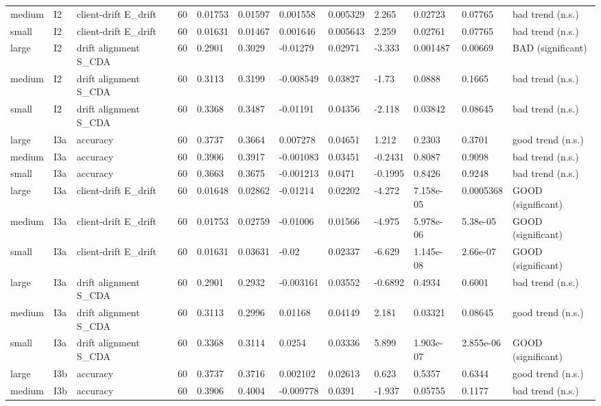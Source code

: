 \begin{table}[t]
\begin{tabular}{llllllllllll}
medium & I2 & client-drift E\_drift & 60 & 0.01753 & 0.01597 & 0.001558 & 0.005329 & 2.265 & 0.02723 & 0.07765 & bad trend (n.s.) \\
small & I2 & client-drift E\_drift & 60 & 0.01631 & 0.01467 & 0.001646 & 0.005643 & 2.259 & 0.02761 & 0.07765 & bad trend (n.s.) \\
large & I2 & drift alignment S\_CDA & 60 & 0.2901 & 0.3029 & -0.01279 & 0.02971 & -3.333 & 0.001487 & 0.00669 & BAD (significant) \\
medium & I2 & drift alignment S\_CDA & 60 & 0.3113 & 0.3199 & -0.008549 & 0.03827 & -1.73 & 0.0888 & 0.1665 & bad trend (n.s.) \\
small & I2 & drift alignment S\_CDA & 60 & 0.3368 & 0.3487 & -0.01191 & 0.04356 & -2.118 & 0.03842 & 0.08645 & bad trend (n.s.) \\
large & I3a & accuracy & 60 & 0.3737 & 0.3664 & 0.007278 & 0.04651 & 1.212 & 0.2303 & 0.3701 & good trend (n.s.) \\
medium & I3a & accuracy & 60 & 0.3906 & 0.3917 & -0.001083 & 0.03451 & -0.2431 & 0.8087 & 0.9098 & bad trend (n.s.) \\
small & I3a & accuracy & 60 & 0.3663 & 0.3675 & -0.001213 & 0.0471 & -0.1995 & 0.8426 & 0.9248 & bad trend (n.s.) \\
large & I3a & client-drift E\_drift & 60 & 0.01648 & 0.02862 & -0.01214 & 0.02202 & -4.272 & 7.158e-05 & 0.0005368 & GOOD (significant) \\
medium & I3a & client-drift E\_drift & 60 & 0.01753 & 0.02759 & -0.01006 & 0.01566 & -4.975 & 5.978e-06 & 5.38e-05 & GOOD (significant) \\
small & I3a & client-drift E\_drift & 60 & 0.01631 & 0.03631 & -0.02 & 0.02337 & -6.629 & 1.145e-08 & 2.66e-07 & GOOD (significant) \\
large & I3a & drift alignment S\_CDA & 60 & 0.2901 & 0.2932 & -0.003161 & 0.03552 & -0.6892 & 0.4934 & 0.6001 & bad trend (n.s.) \\
medium & I3a & drift alignment S\_CDA & 60 & 0.3113 & 0.2996 & 0.01168 & 0.04149 & 2.181 & 0.03321 & 0.08645 & good trend (n.s.) \\
small & I3a & drift alignment S\_CDA & 60 & 0.3368 & 0.3114 & 0.0254 & 0.03336 & 5.899 & 1.903e-07 & 2.855e-06 & GOOD (significant) \\
large & I3b & accuracy & 60 & 0.3737 & 0.3716 & 0.002102 & 0.02613 & 0.623 & 0.5357 & 0.6344 & good trend (n.s.) \\
medium & I3b & accuracy & 60 & 0.3906 & 0.4004 & -0.009778 & 0.0391 & -1.937 & 0.05755 & 0.1177 & bad trend (n.s.) \\

\end{tabular}
\end{table}
